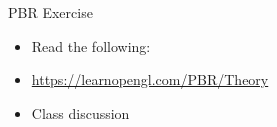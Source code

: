 \begin{frame}{PBR Exercise}
	\begin{itemize}
		\item Read the following:
		\item \url{https://learnopengl.com/PBR/Theory}
		\item Class discussion
	\end{itemize}
\end{frame}